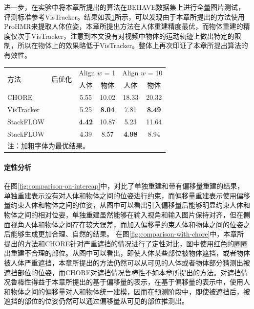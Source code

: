 进一步，在实验中将本章所提出的算法在BEHAVE数据集上进行全量图片测试，评测标准参考VisTracker\citep{bhatnagar22behave}。结果如表\ref{tab:stackflow_behave_performance_seq}所示，可以发现由于本章所提出的方法使用ProHMR来提取人体位姿，本章所提出方法在人体重建精度最优，而物体重建的精度仅次于VisTracker，注意到本文没有对视频中物体的运动轨迹上做出特定的限制，所以在物体上的效果略低于VisTracker。整体上再次印证了本章所提出算法的有效性。

\begin{table}[!htbp]
	\label{tab:stackflow_behave_performance_seq}
	\centering
	\footnotesize
	\setlength{\tabcolsep}{4pt}
	\renewcommand{\arraystretch}{1.2}
	\begin{tabular}{lccccc}
		\toprule
		\multirow{2}{*}{方法} & \multirow{2}{*}{后优化} & \multicolumn{2}{c}{Align $w$ = 1} & \multicolumn{2}{c}{Align $w$ = 10} \\
		\cline{3-6}
		& & 人体 & 物体 & 人体 & 物体 \\
		\hline
		CHORE & \Checkmark & 5.55 & 10.02 & 18.33 & 20.32 \\
		VisTracker & \Checkmark & 5.25 & \textbf{8.04} & 7.81 & \textbf{8.49} \\
		StackFLOW & \XSolidBrush & \textbf{4.42} & 10.87 & 5.23 & 11.64 \\
		StackFLOW & \Checkmark & 4.39 & 8.57 & \textbf{4.98} & 8.94 \\
		\bottomrule
		\multicolumn{6}{l}{注：加粗字体为最优结果。}
	\end{tabular}
\end{table}


\paragraph{定性分析}
在图\ref{fig:comparison-on-intercap}中，对比了单独重建和带有偏移量重建的结果，单独重建表示没有对人体和物体之间的位姿进行约束，而偏移量重建表示使用偏移量约束人体和物体之间的位姿，从图中可以看出引入偏移量后能够明显约束人体和物体之间的相对位姿，单独重建虽然能够在输入视角和输入图片保持对齐，但在侧面视角人体和物体之间存在较大误差，而加入偏移量约束人体和物体之间的位姿之后能够生成更加合理、自然的结果。
在图\ref{fig:comparison-with-chore}中，本章所提出的方法和CHORE针对严重遮挡的情况进行了定性对比，图中使用红色的圈圈出重建不合理的部位。从图中可以看出，即使人体某些部位被物体遮挡，或者物体被人体严重遮挡，本章所提出的方法仍然可以从可见的人体或者物体部分猜测出被遮挡部位的位姿，而CHORE对遮挡情况鲁棒性不如本章所提出的方法。对遮挡情况鲁棒性得益于本章所提出的基于偏移量的表示，在基于偏移量的表示中，使用人和物体之间的偏移量对人和物体统一建模，因而在预测阶段中，即使被遮挡后，被遮挡的部位的位姿仍然可以通过偏移量从可见的部位推测出。


